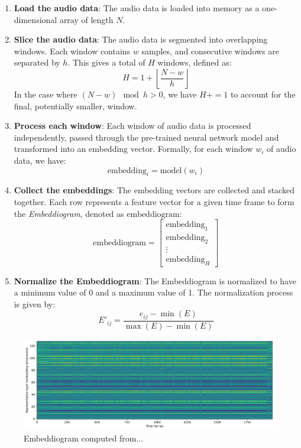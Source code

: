 \begin{enumerate}
\item \textbf{Load the audio data}: The audio data is loaded into memory as a one-dimensional array of length $N$.

\item \textbf{Slice the audio data}: The audio data is segmented into overlapping windows. Each window contains $w$ samples, and consecutive windows are separated by $h$. This gives a total of $H$ windows, defined as:
\begin{equation}
H = 1 + \left\lfloor \frac{N - w}{h} \right\rfloor
\end{equation}
In the case where $\left( N - w \right) \mod h > 0$, we have $H += 1$ to account for the final, potentially smaller, window.

\item \textbf{Process each window}: Each window of audio data is processed independently, passed through the pre-trained neural network model and transformed into an embedding vector. Formally, for each window $w_i$ of audio data, we have:
\begin{equation}
\text{embedding}_i = \text{model}(w_i)
\end{equation}

\item \textbf{Collect the embeddings}: The embedding vectors are collected and stacked together. Each row represents a feature vector for a given time frame to form the \textit{Embeddiogram}, denoted as $\text{embeddiogram}$:
\begin{equation}
\text{embeddiogram} = \begin{bmatrix} \text{embedding}_1 \\ \text{embedding}_2 \\ \vdots \\ \text{embedding}_H \end{bmatrix}
\end{equation}

\item \textbf{Normalize the Embeddiogram}: The Embeddiogram is normalized to have a minimum value of 0 and a maximum value of 1. The normalization process is given by:
\begin{equation}
E'_{ij} = \frac{e_{ij} - \min(E)}{\max(E) - \min(E)}
\end{equation}
\end{enumerate}

\begin{figure}
    \centering
    \includegraphics[width=\textwidth]{figures/images/embeddiogram SALAMI 3.png}
    \caption[Embeddiogram]{Embeddiogram computed from...}
    \label{fig:embeddiogram}
\end{figure}


